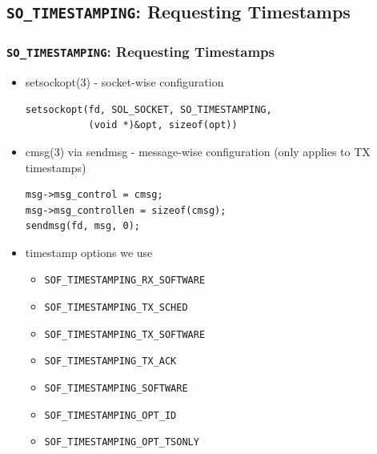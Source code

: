 \documentclass[10pt]{beamer}
\begin{document}
\subsection{\texttt{SO\_TIMESTAMPING}: Requesting Timestamps}
\begin{frame}[fragile]
\frametitle{\texttt{SO\_TIMESTAMPING}: Requesting Timestamps}
\begin{itemize}
\item setsockopt(3) - socket-wise configuration
      {\small
      \begin{verbatim}
setsockopt(fd, SOL_SOCKET, SO_TIMESTAMPING,
           (void *)&opt, sizeof(opt))\end{verbatim}
      }
\item cmsg(3) via sendmsg - message-wise configuration (only applies to TX
      timestamps)
      {\small
      \begin{verbatim}
msg->msg_control = cmsg;
msg->msg_controllen = sizeof(cmsg);
sendmsg(fd, msg, 0);\end{verbatim}
      }
\item timestamp options we use
      \begin{itemize}
      \item \small\texttt{SOF\_TIMESTAMPING\_RX\_SOFTWARE}
      \item \small\texttt{SOF\_TIMESTAMPING\_TX\_SCHED}
      \item \small\texttt{SOF\_TIMESTAMPING\_TX\_SOFTWARE}
      \item \small\texttt{SOF\_TIMESTAMPING\_TX\_ACK}
      \item \small\texttt{SOF\_TIMESTAMPING\_SOFTWARE}
      \item \small\texttt{SOF\_TIMESTAMPING\_OPT\_ID}
      \item \small\texttt{SOF\_TIMESTAMPING\_OPT\_TSONLY}
      \end{itemize}
\end{itemize}
\end{frame}
\end{document}
